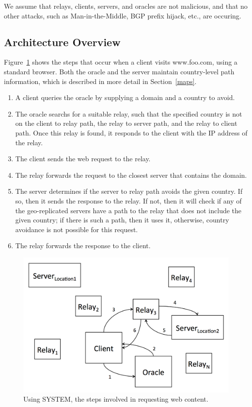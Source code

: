 We assume that relays, clients, servers, and oracles are not malicious, and that no other attacks, such as Man-in-the-Middle, BGP prefix hijack, etc., are occuring.

\subsection{Architecture Overview}

Figure~\ref{fig:overview} shows the steps that occur when a client visits www.foo.com, using a standard browser. Both the oracle and the server maintain country-level path information, which is described in more detail in Section~\ref{maps}.

\begin{enumerate}
\item A client queries the oracle by supplying a domain and a country to avoid.  
\item The oracle searchs for a suitable relay, such that the specified country is not on the client to relay path, the relay to server path, and the relay to client path.  Once this relay is found, it responds to the client with the IP address of the relay.
\item The client sends the web request to the relay.
\item The relay forwards the request to the closest server that contains the domain.
\item The server determines if the server to relay path avoids the given country.  If so, then it sends the response to the relay. If not, then it will check if any of the geo-replicated servers have a path to the relay that does not include the given country; if there is such a path, then it uses it, otherwise, country avoidance is not possible for this request.
\item The relay forwards the response to the client.
\end{enumerate}

\begin{figure}
\centering
\includegraphics[width=.5\textwidth]{system_overview}
\caption{Using SYSTEM, the steps involved in requesting web content.}
\label{fig:overview}
\end{figure}

